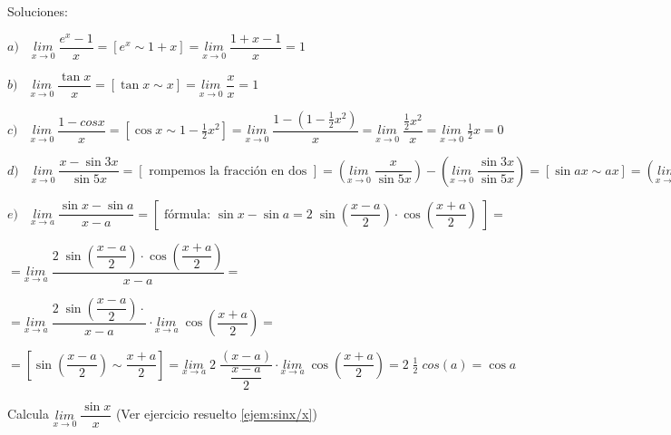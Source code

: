 	\begin{proofw}\renewcommand{\qedsymbol}{$\diamond$}	
	Soluciones:
	
	$a)\quad \underset {x \to 0 }{lim} \; {\dfrac {e^x-1} {x} }=[e^x \sim 1+x]=\underset {x \to 0 }{lim} \; {\dfrac {1+x-1} {x} }=1$
	
	$b) \quad \underset {x\to 0 }{lim}\;{\dfrac {\tan x}{x}}=[\tan x \sim x]=\underset {x\to 0 }{lim}\;{\dfrac { x}{x}}=1$
	
	$c) \quad \underset {x\to 0}{lim}\;{\dfrac {1-cos x}{x}}=[\cos x \sim 1-\frac 1 2 x^2]=\underset {x\to 0}{lim}\;{\dfrac {1-(1-\frac 1 2 x^2)}{x}}=\underset {x\to 0}{lim}\;{\dfrac {\frac 1 2 x^2}{x}}=\underset {x\to 0}{lim}\;{\frac 1 2 x}=0$
	
	$d) \quad \underset {x\to 0 }{lim}\;{\dfrac {x-\sin 3x}{\sin 5x}} =[\mbox{ rompemos la fracción en dos }] = \left( \underset {x\to 0 }{lim}\;{ \dfrac {x}{\sin 5x} } \right) - \left( \underset {x\to 0 }{lim}\;{ \dfrac {\sin 3x}{\sin 5x} } \right) =[\sin ax 	\sim ax]= \left( \underset {x\to 0 }{lim}\;{ \dfrac {x}{ 5x} } \right) - \left( \underset {x\to 0 }{lim}\;{ \dfrac {3x}{ 5x} } \right) = \frac 1 5 -\frac 3 5=-\frac 2 5$
	
	$e) \quad \underset {x\to a}{lim}\;{ \dfrac {\sin x - \sin a}{x-a} }=\left[ \mbox { fórmula: }  \sin x - \sin a = 2 \;  \sin {\left( \dfrac {x-a}{2} \right)}   \cdot \cos { \left( \dfrac {x+a}{2} \right) } \; \right] =$
	
	$= \underset {x\to a}{lim}\;{ \dfrac {2 \;  \sin {\left( \dfrac {x-a}{2} \right)}   \cdot \cos { \left( \dfrac {x+a}{2} \right) }}{x-a} } =$
	
	$= \underset {x\to a}{lim}\;{ \dfrac {2 \;  \sin {\left( \dfrac {x-a}{2} \right)}   \cdot }{x-a} } \cdot \underset {x\to a}{lim}\;{ \cos { \left( \dfrac {x+a}{2} \right) } } =$
	
	$=\left[ \sin \left ( \dfrac {x-a}{2}\right) \sim \dfrac {x+a}{2} \right] = \underset {x\to a}{lim}\;{ 2 \; \dfrac { (x-a) }{\dfrac {x-a}{2}} } \cdot \underset {x\to a}{lim}\;{ \cos { \left( \dfrac {x+a}{2} \right) } }= 2 \; \frac 1 2 \; cos(a) = \cos a$ 
	\end{proofw}
	

	





	\begin{ejre} Calcula $\underset{x\to 0}{lim}\;{\dfrac {\sin x}{x}}$ (Ver ejercicio resuelto \ref{ejem:sinx/x})
	\end{ejre}
	
